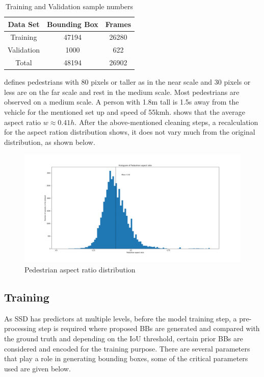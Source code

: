 \begin {table}[H]
\begin{center}
 \begin{tabular}{||c c c||}
 \hline
 Data Set & Bounding Box & Frames\\ [0.8ex] 
 \hline\hline
 Training & 47194 & 26280 \\
 \hline
 Validation & 1000 & 622 \\
 \hline
 Total & 48194 & 26902 \\
 \hline
\end{tabular}
\caption{Training and Validation sample numbers}
\end{center}
\end {table}

\cite{dollar2009pedestrian} defines pedestrians with 80 pixels or taller as in the near scale and 30 pixels or less
are on the far scale and rest in the medium scale. Most pedestrians are observed on a medium scale. A person with 1.8m tall is 1.5s away from the vehicle for the mentioned set up and speed of 55km\/h. \cite{dollar2011pedestrian} shows that the average aspect ratio \textit{$w \approx 0.41h$}. After the above-mentioned cleaning steps, a recalculation for the aspect ration distribution shows, it does not vary much from the original distribution, as shown below.

\begin{figure}[H]
\includegraphics[scale=0.4]{aspect_ratio_distribution}
\begin{center}
\caption{Pedestrian aspect ratio distribution}
\end{center}
\end{figure}

\subsection{Training }
As SSD has predictors at multiple levels, before the model training step, a pre-processing step is required where proposed BBs are generated and compared with the ground truth and depending on the IoU threshold, certain prior BBs are considered and encoded for the training purpose. There are several parameters that play a role in generating bounding boxes, some of the critical parameters used are given below.

